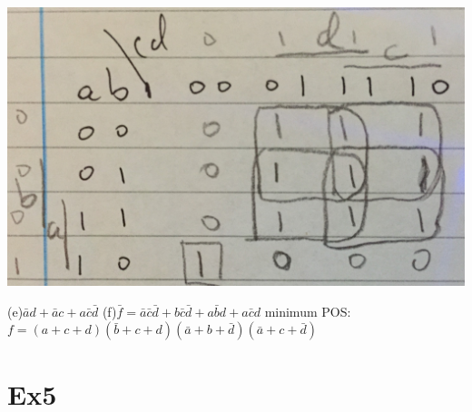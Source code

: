 \documentclass[10pt,twoside,a4paper]{article}
\begin{document}
\includegraphics[scale=0.1]{4-d.JPG}

(e)$\bar{a}d+\bar{a}c+a\bar{c}\bar{d}$\newline
(f)$\bar{f}=\bar{a}\bar{c}\bar{d}+b\bar{c}\bar{d}+a\bar{b}d+a\bar{c}d$\newline
minimum POS:$f=(a+c+d)(\bar{b}+c+d)(\bar{a}+b+\bar{d})(\bar{a}+c+\bar{d})$
\section{Ex5}
\end{document}

